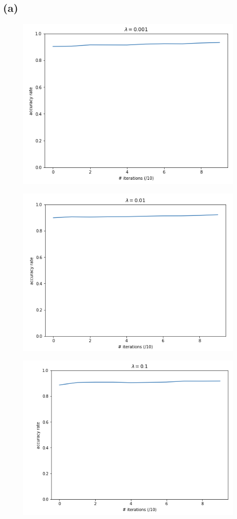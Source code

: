 \documentclass[11pt]{article}
\begin{document}
\subsection*{(a)}
\begin{figure}[h!]
	\centering
	\includegraphics[width=125mm]{graph_1.png}
\end{figure}
\clearpage
\begin{figure}[h!]
	\centering
	\includegraphics[width=125mm]{graph_2.png}
\end{figure}
\begin{figure}[h!]
	\centering
	\includegraphics[width=125mm]{graph_3.png}
\end{figure}
\end{document}
